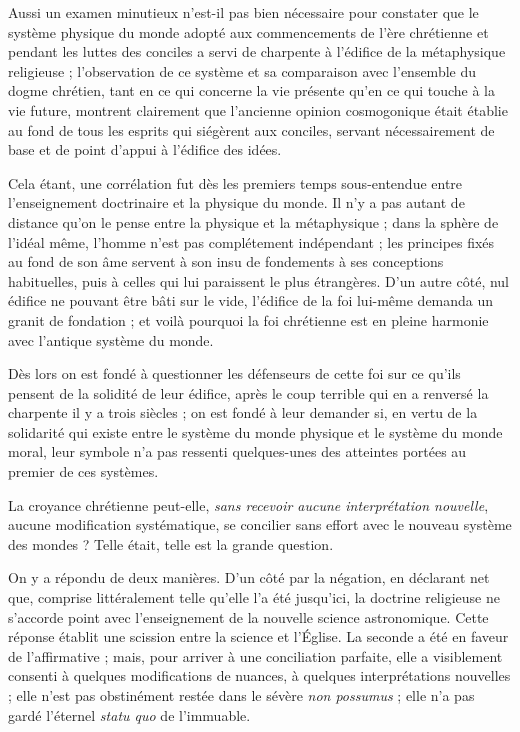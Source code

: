 \documentclass[a4paper, 11pt, oneside, landscape]{article}
\begin{document}
Aussi un examen minutieux n'est-il pas bien nécessaire pour constater que le système physique du monde adopté aux commencements de l'ère chrétienne et pendant les luttes des conciles a servi de charpente à l'édifice de la métaphysique religieuse ; l'observation de ce système et sa comparaison avec l'ensemble du dogme chrétien, tant en ce qui concerne la vie présente qu'en ce qui touche à la vie future, montrent clairement que l'ancienne opinion cosmogonique était établie au fond de tous les esprits qui siégèrent aux conciles, servant nécessairement de base et de point d'appui à l'édifice des idées.

Cela étant, une corrélation fut dès les premiers temps sous-entendue entre l'enseignement doctrinaire et la physique du monde. Il n'y a pas autant de distance qu'on le pense entre la physique et la métaphysique ; dans la sphère de l'idéal même, l'homme n'est pas complétement indépendant ; les principes fixés au fond de son âme servent à son insu de fondements à ses conceptions habituelles, puis à celles qui lui paraissent le plus étrangères. D'un autre côté, nul édifice ne pouvant être bâti sur le vide, l'édifice de la foi lui-même demanda un granit de fondation ; et voilà pourquoi la foi chrétienne est en pleine harmonie avec l'antique système du monde.

Dès lors on est fondé à questionner les défenseurs de cette foi sur ce qu'ils pensent de la solidité de leur édifice, après le coup terrible qui en a renversé la charpente il y a trois siècles ; on est fondé à leur demander si, en vertu de la solidarité qui existe entre le système du monde physique et le système du monde moral, leur symbole n'a pas ressenti quelques-unes des atteintes portées au premier de ces systèmes.

La croyance chrétienne peut-elle, \emph{sans recevoir aucune interprétation nouvelle}, aucune modification systématique, se concilier sans effort avec le nouveau système des mondes ? Telle était, telle est la grande question.

On y a répondu de deux manières. D'un côté par la négation, en déclarant net que, comprise littéralement telle qu'elle l'a été jusqu'ici, la doctrine religieuse ne s'accorde point avec l'enseignement de la nouvelle science astronomique. Cette réponse établit une scission entre la science et l'Église. La seconde a été en faveur de l'affirmative ; mais, pour arriver à une conciliation parfaite, elle a visiblement consenti à quelques modifications de nuances, à quelques interprétations nouvelles ; elle n'est pas obstinément restée dans le sévère \emph{non possumus} ; elle n'a pas gardé l'éternel \emph{statu quo} de l'immuable.
\end{document}
